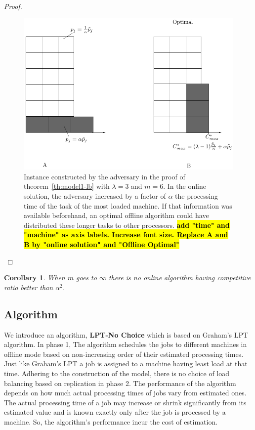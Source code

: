 \documentclass[10pt, conference, compsocconf]{IEEEtran}
\newtheorem{corollary}{Corollary}[theorem]
\newcommand{\todo}[1]{{\color{red}\textbf{\hl{#1}}\xspace}}
\begin{document}
\begin{proof}
  \begin{figure}[htp]
  \centering
  \includegraphics[width= 8 cm]{model1.pdf}
  \caption{Instance constructed by the adversary in the proof of
    theorem~\ref{th:model1-lb} with $\lambda = 3$ and $m = 6$. In the
    online solution, the adversary increased by a factor of $\alpha$
    the processing time of the task of the most loaded machine. If
    that information was available beforehand, an optimal offline
    algorithm could have distributed these longer tasks to other
    processors.  \todo{add "time" and "machine" as axis
      labels. Increase font size. Replace A and B by "online solution"
      and "Offline Optimal"}}
  \label{fig:rara}
  \end{figure}
\end{proof}    
  
  
  \begin{corollary}
  When $m$ goes to $\infty$ there is no online algorithm having competitive ratio better than $\alpha^{2}$.
  \end{corollary}
  
\subsection{Algorithm}

We introduce an algorithm, \textbf{LPT-No Choice} which is based on
Graham's LPT algorithm. In phase 1, The algorithm schedules the jobs
to different machines in offline mode based on non-increasing order of
their estimated processing times. Just like Graham's LPT a job is
assigned to a machine having least load at that time. Adhering to the
construction of the model, there is no choice of load balancing based
on replication in phase 2. The performance of the algorithm depends on
how much actual processing times of jobs vary from estimated ones. The
actual processing time of a job may increase or shrink significantly
from its estimated value and is known exactly only after the job is
processed by a machine. So, the algorithm's performance incur the cost
of estimation.
\end{document}
